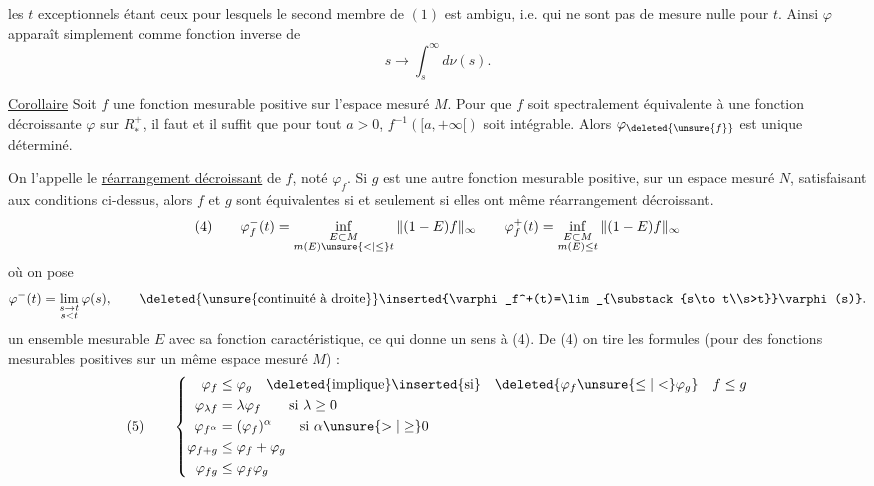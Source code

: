 les \(t\) exceptionnels étant ceux pour lesquels le second membre de \((1)\) est ambigu, i.e. qui ne sont pas de mesure nulle pour \(t\). Ainsi \(\varphi\) apparaît simplement comme fonction inverse de
\[
s\to\int_s^\infty d\nu(s).
\]

\uline{Corollaire} Soit \(f\) une fonction mesurable positive sur l'espace mesuré \(M\). Pour que \(f\) soit spectralement équivalente à une fonction décroissante \(\varphi\) sur \(R_*^+\), il faut et il suffit que pour tout \(a>0\), \(f^{-1}([a,+\infty[)\) soit intégrable. Alors \(\varphi_{\deleted{\unsure{f}}}\) est unique déterminé.

 On l'appelle le \uline{réarrangement décroissant} de \(f\), noté \(\varphi_f\). Si  \(g\) est une autre fonction mesurable positive, sur un espace mesuré \(N\), satisfaisant aux conditions ci-dessus, alors \(f\) et \(g\) sont  équivalentes si et seulement si elles ont même réarrangement décroissant.
\[
(4)\qquad
\varphi_f^-(t)=\inf_{\substack{E\subset M\\m(E)\unsure{<|\leq}t}}\|(1-E)f\|_\infty
\qquad
\varphi_f^+(t)=\inf_{\substack{E\subset M\\m(E)\leq t}}\|(1-E)f\|_\infty
\]
où  on pose
\[
\varphi^-(t)=\lim_{\substack{s\to t\\s<t}}\varphi(s),
\qquad\deleted{\unsure{\text{continuité à droite}}}\inserted{\varphi_f^+(t)=\lim_{\substack{s\to t\\s>t}}\varphi(s)}.
\]
 un ensemble mesurable \(E\) avec sa fonction caractéristique, ce qui donne un sens à (4). De (4) on tire les formules (pour des fonctions mesurables positives sur un même espace mesuré \(M\))  :
\[
(5)\qquad
\left\{\begin{aligned}
\varphi_f&\leq\varphi_g\quad\deleted{\text{implique}}\inserted{\text{si}}\quad\deleted{\varphi_f\unsure{\leq|<}\varphi_g}\quad f\leq g\\
\varphi_{\lambda f}&=\lambda\varphi_f\qquad\text{si }\lambda\geq0\\
\varphi_{f^\alpha}&=(\varphi_f)^\alpha\qquad\text{si }\alpha\unsure{>|\geq}0\\
\varphi_{f+g}&\leq\varphi_f+\varphi_g\\
\varphi_{fg}&\leq\varphi_f\varphi_g
\end{aligned}\right.
\]

